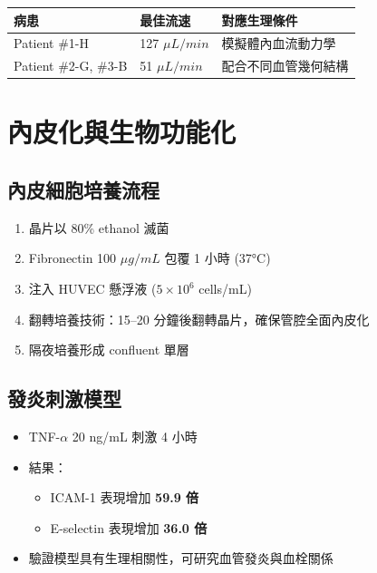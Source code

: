 \documentclass[12pt,a4paper]{article}
\begin{document}
\begin{longtable}{p{4cm}p{4cm}p{6cm}}
\toprule
\textbf{病患} & \textbf{最佳流速} & \textbf{對應生理條件} \\
\midrule
\endhead
Patient \#1-H & 127 $\mu L/min$ & 模擬體內血流動力學 \\
\midrule
Patient \#2-G, \#3-B & 51 $\mu L/min$ & 配合不同血管幾何結構 \\
\bottomrule
\end{longtable}

\section{內皮化與生物功能化}

\subsection{內皮細胞培養流程}

\begin{enumerate}
    \item 晶片以 80\% ethanol 滅菌
    \item Fibronectin 100 $\mu g/mL$ 包覆 1 小時 (37°C)
    \item 注入 HUVEC 懸浮液 ($5 \times 10^6$ cells/mL)
    \item 翻轉培養技術：15--20 分鐘後翻轉晶片，確保管腔全面內皮化
    \item 隔夜培養形成 confluent 單層
\end{enumerate}

\subsection{發炎刺激模型}

\begin{itemize}
    \item TNF-$\alpha$ 20 ng/mL 刺激 4 小時
    \item 結果：
    \begin{itemize}
        \item ICAM-1 表現增加 \textbf{59.9 倍}
        \item E-selectin 表現增加 \textbf{36.0 倍}
    \end{itemize}
    \item 驗證模型具有生理相關性，可研究血管發炎與血栓關係
\end{itemize}
\end{document}
